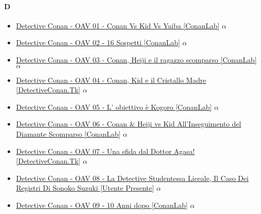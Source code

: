 		\paragraph{D} \hypertarget{OD}{}
			\begin{itemize}
			
				\item \href{https://mega.nz/#!9I8DhAoT!emtuSehpMr5CKseotyt5LFYb5sGwWfCU8kiga-ykeRs} {Detective Conan - OAV 01 - Conan Vs Kid Vs Yaiba [ConanLab]}  $\alpha$   \\ 
				\item \href{https://mega.nz/#!kQkHWARA!xxnoauQD3ulM5rS8aRJW2CLtaNuilP9X-mCr_GCB7Y4} {Detective Conan - OAV 02 - 16 Sospetti [ConanLab]}  $\alpha$   \\ 
				\item \href{https://mega.nz/#!5cUAWQ6A!FEAAstu6UVtJxRvAP2NTy9xPn3uZvRv2GJ3a3SJAK8s} {Detective Conan - OAV 03 - Conan, Heiji e il ragazzo scomparso [ConanLab]}  $\alpha$   \\ 
				\item \href{https://mega.nz/#!1I8wxYpI!-uFHEJs6pTecKJsATF6vuv3dWd2pXE_75OwbkrujQ_o} {Detective Conan - OAV 04 - Conan, Kid e il Cristallo Madre [DetectiveConan.Tk]}  $\alpha$   \\ 
				\item \href{https://mega.nz/#!4MVxSBKS!c_7F3Hc-caYVqQN-fwzx5QmHTDK5HQweziOIjUu4hGk} {Detective Conan - OAV 05 - L' obiettivo è Kogoro [ConanLab]}  $\alpha$   \\ 
				\item \href{https://mega.nz/#!IQUDBAhC!6gHxhYiYaYdXgpRXb_UkpYkqUKDtazecnfj1RtKrMzY} {Detective Conan - OAV 06 - Conan \& Heiji vs Kid All'Inseguimento del Diamante Scomparso [ConanLab]}  $\alpha$   \\ 
				\item \href{https://mega.nz/#!tI0xyKyb!CPgGrFhGL2GE2jLA5-UaLu9zHZn-O8Z_TosGfU0jLW4} {Detective Conan - OAV 07 - Una sfida dal Dottor Agasa! [DetectiveConan.Tk]}  $\alpha$   \\ 
				\item \href{https://mega.nz/#!IA9CkB4Q!svokDXEegwTj1OyPG7l0cUl8OwnG7BSnuvMoDzFnamE} {Detective Conan - OAV 08 - La Detective Studentessa Liceale, Il Caso Dei Registri Di Sonoko Suzuki [Utente Presente]}  $\alpha$   \\ 
				\item \href{https://mega.nz/#!0YEzgbyL!7Xqm70OWAodkNdJglfE669zQJYHXcT0whfwPQwrxeCY} {Detective Conan - OAV 09 - 10 Anni dopo [ConanLab]}  $\alpha$   \\ 

\end{itemize}
